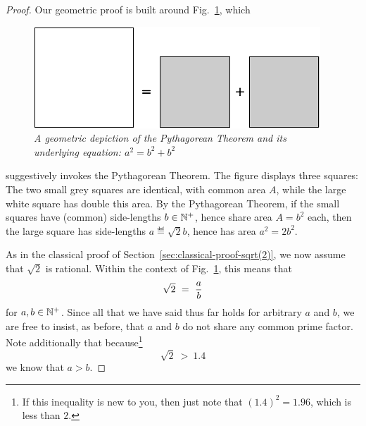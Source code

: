 \begin{proof}
Our geometric proof is built around Fig.~\ref{fig:irrationality1}, which
\begin{figure}[htb]
\begin{center}
       \includegraphics[scale=0.4]{FiguresArithmetic/sqrt2initial}
\caption{{\it A geometric depiction of the Pythagorean Theorem and its
    underlying equation: $a^2 = b^2 + b^2$}
\label{fig:irrationality1}}
\end{center}
\end{figure}
suggestively invokes the Pythagorean Theorem.  The figure displays three squares: The two small grey squares are identical, with common area $A$, while the large white square has double this area.  By the Pythagorean Theorem, if the small squares have (common) side-lengths $b \in \mathbb{N}^+$, hence share area $A = b^2$ each, then the large square has side-lengths $a \eqdef \sqrt{2}b$, hence has area $a^2 = 2 b^2$.

As in the classical proof of Section~\ref{sec:classical-proof-sqrt(2)}, we now assume that $\sqrt{2}$ is rational.  Within the context of Fig.~\ref{fig:irrationality1}, this means that
\[ \sqrt{2} \ = \ {a \over b} \]
for $a, b \in \mathbb{N}^+$.  Since all that we have said thus far holds for arbitrary $a$ and $b$, we are free to insist, as before, that $a$ and $b$ do not share any common prime factor.  Note additionally that because\footnote{If this inequality is new to you, then just note that $(1.4)^2 = 1.96$, which is less than $2$.}
\[ \sqrt{2} \ > \ 1.4 \]
we know that $a > b$.

\bigskip

\noindent {}
\bigskip


\end{proof}
